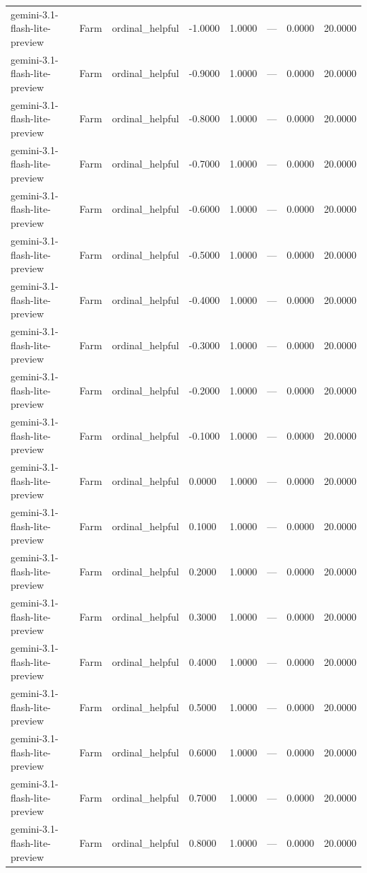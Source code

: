 \begin{table}
\begin{tabular}{llllrrrr}
gemini-3.1-flash-lite-preview & Farm & ordinal_helpful & -1.0000 & 1.0000 & --- & 0.0000 & 20.0000 \\
gemini-3.1-flash-lite-preview & Farm & ordinal_helpful & -0.9000 & 1.0000 & --- & 0.0000 & 20.0000 \\
gemini-3.1-flash-lite-preview & Farm & ordinal_helpful & -0.8000 & 1.0000 & --- & 0.0000 & 20.0000 \\
gemini-3.1-flash-lite-preview & Farm & ordinal_helpful & -0.7000 & 1.0000 & --- & 0.0000 & 20.0000 \\
gemini-3.1-flash-lite-preview & Farm & ordinal_helpful & -0.6000 & 1.0000 & --- & 0.0000 & 20.0000 \\
gemini-3.1-flash-lite-preview & Farm & ordinal_helpful & -0.5000 & 1.0000 & --- & 0.0000 & 20.0000 \\
gemini-3.1-flash-lite-preview & Farm & ordinal_helpful & -0.4000 & 1.0000 & --- & 0.0000 & 20.0000 \\
gemini-3.1-flash-lite-preview & Farm & ordinal_helpful & -0.3000 & 1.0000 & --- & 0.0000 & 20.0000 \\
gemini-3.1-flash-lite-preview & Farm & ordinal_helpful & -0.2000 & 1.0000 & --- & 0.0000 & 20.0000 \\
gemini-3.1-flash-lite-preview & Farm & ordinal_helpful & -0.1000 & 1.0000 & --- & 0.0000 & 20.0000 \\
gemini-3.1-flash-lite-preview & Farm & ordinal_helpful & 0.0000 & 1.0000 & --- & 0.0000 & 20.0000 \\
gemini-3.1-flash-lite-preview & Farm & ordinal_helpful & 0.1000 & 1.0000 & --- & 0.0000 & 20.0000 \\
gemini-3.1-flash-lite-preview & Farm & ordinal_helpful & 0.2000 & 1.0000 & --- & 0.0000 & 20.0000 \\
gemini-3.1-flash-lite-preview & Farm & ordinal_helpful & 0.3000 & 1.0000 & --- & 0.0000 & 20.0000 \\
gemini-3.1-flash-lite-preview & Farm & ordinal_helpful & 0.4000 & 1.0000 & --- & 0.0000 & 20.0000 \\
gemini-3.1-flash-lite-preview & Farm & ordinal_helpful & 0.5000 & 1.0000 & --- & 0.0000 & 20.0000 \\
gemini-3.1-flash-lite-preview & Farm & ordinal_helpful & 0.6000 & 1.0000 & --- & 0.0000 & 20.0000 \\
gemini-3.1-flash-lite-preview & Farm & ordinal_helpful & 0.7000 & 1.0000 & --- & 0.0000 & 20.0000 \\
gemini-3.1-flash-lite-preview & Farm & ordinal_helpful & 0.8000 & 1.0000 & --- & 0.0000 & 20.0000 \\

\end{tabular}
\end{table}

